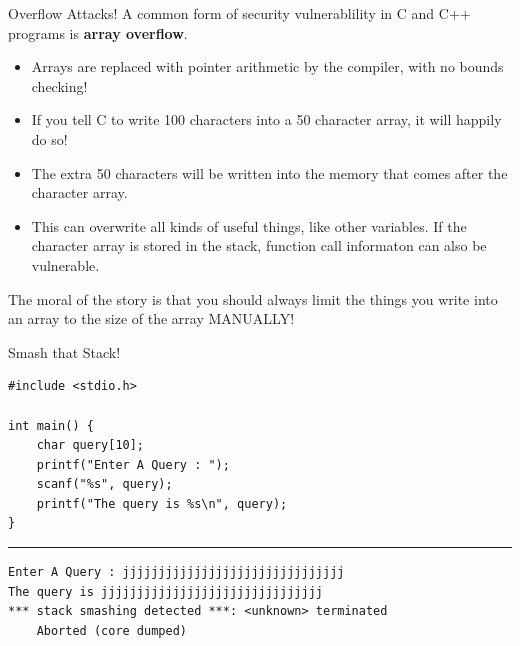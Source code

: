 \documentclass[11pt]{beamer}
\begin{document}
\begin{frame}{Overflow Attacks!}
A common form of security vulnerablility in C and C++ programs is \textbf{array overflow}. 
\begin{itemize}
\item Arrays are replaced with pointer arithmetic by the compiler, with no bounds checking!  
\item If you tell C to write 100 characters into a 50 character array, it will happily do so! 
\item The extra 50 characters will be written into the memory that comes after the character array.
\item This can overwrite all kinds of useful things, like other variables.  If the character array is stored in the stack, function call informaton can also be vulnerable.  
\end{itemize}
The moral of the story is that you should always limit the things you write into an array to the size of the array MANUALLY! 
\end{frame}

\begin{frame}[fragile=singleslide]{Smash that Stack!}
\begin{lstlisting}[style = C]
#include <stdio.h>

int main() {
	char query[10];
	printf("Enter A Query : ");
	scanf("%s", query);
	printf("The query is %s\n", query);
}
\end{lstlisting}
\hrule
\begin{lstlisting}[style=terminal]
Enter A Query : jjjjjjjjjjjjjjjjjjjjjjjjjjjjjjj
The query is jjjjjjjjjjjjjjjjjjjjjjjjjjjjjjj
*** stack smashing detected ***: <unknown> terminated
	Aborted (core dumped)
\end{lstlisting}
\end{frame}
\end{document}
